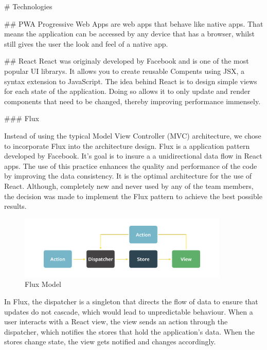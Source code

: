 \begin{markdown}
# Technologies



## PWA
\cite{}
Progressive Web Apps are web apps that behave like native apps. That means the application can be accessed by any device that has a browser, whilst still gives the user the look and feel of a native app.

## React
React\cite{React} was originaly developed by Facebook and is one of the most popular UI librarys. It allows you to create reusable Compents using JSX, a syntax extension to JavaScript.
The idea behind React is to design simple views for each state of the application. Doing so allows it to only update and render components that need to be changed, thereby improving performance immensely.


### Flux

Instead of using the typical Model View Controller (MVC) architecture, we chose to incorporate Flux\cite{OurReadme} into the architecture design. Flux is a application pattern developed by Facebook. It's goal is to insure a a unidirectional data flow in React apps. The use of this practice enhances the quality and performance of the code by improving the data consistency. It is the optimal architecture for the use of React. Although, completely new and never used by any of the team members, the decision was made to implement the Flux pattern to achieve the best possible results.

\begin{figure}[H]
  \includegraphics[width=10cm, center]{./assets/flux.png}
  \caption{Flux Model{\cite{FluxModel}}}
\end{figure}




In Flux, the dispatcher is a singleton that directs the flow of data to ensure that updates do not cascade, which would lead to unpredictable behaviour. When a user interacts with a React view, the view sends an action through the dispatcher, which notifies the stores that hold the application’s data. When the stores change state, the view gets notified and changes accordingly.


\end{markdown}
